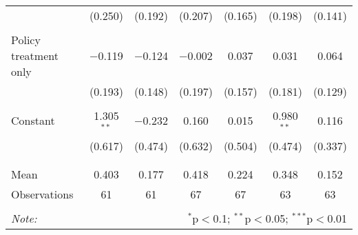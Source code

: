 \begin{tabular}{@{\extracolsep{5pt}}lcccccc}
  & (0.250) & (0.192) & (0.207) & (0.165) & (0.198) & (0.141) \\ 
  & & & & & & \\ 
 Policy treatment only & $-$0.119 & $-$0.124 & $-$0.002 & 0.037 & 0.031 & 0.064 \\ 
  & (0.193) & (0.148) & (0.197) & (0.157) & (0.181) & (0.129) \\ 
  & & & & & & \\ 
 Constant & 1.305$^{**}$ & $-$0.232 & 0.160 & 0.015 & 0.980$^{**}$ & 0.116 \\ 
  & (0.617) & (0.474) & (0.632) & (0.504) & (0.474) & (0.337) \\ 
  & & & & & & \\ 
\hline \\[-1.8ex] 
Mean & 0.403 & 0.177 & 0.418 & 0.224 & 0.348 & 0.152 \\ 
Observations & 61 & 61 & 67 & 67 & 63 & 63 \\ 
\hline 
\hline \\[-1.8ex] 
\textit{Note:}  & \multicolumn{6}{r}{$^{*}$p$<$0.1; $^{**}$p$<$0.05; $^{***}$p$<$0.01} \\ 
\end{tabular} 
